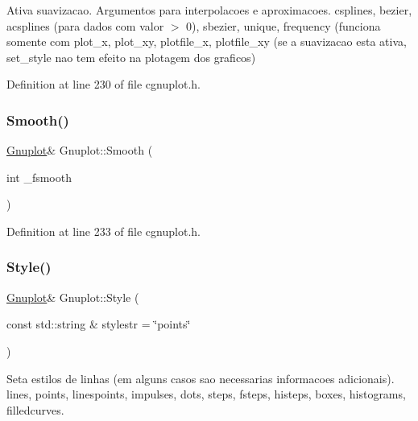 Ativa suavizacao. Argumentos para interpolacoes e aproximacoes. csplines, bezier, acsplines (para dados com valor $>$ 0), sbezier, unique, frequency (funciona somente com plot\+\_\+x, plot\+\_\+xy, plotfile\+\_\+x, plotfile\+\_\+xy (se a suavizacao esta ativa, set\+\_\+style nao tem efeito na plotagem dos graficos) 



Definition at line 230 of file cgnuplot.\+h.

\mbox{\label{class_gnuplot_a9eaf8050edfad9d926d41b102d2f24cb}} 
\subsubsection{\texorpdfstring{Smooth()}{Smooth()}\hspace{0.1cm}{\footnotesize\ttfamily [2/2]}}
{\footnotesize\ttfamily \hyperlink{class_gnuplot}{Gnuplot}\& Gnuplot\+::\+Smooth (\begin{DoxyParamCaption}\item[{int}]{\+\_\+fsmooth }\end{DoxyParamCaption})\hspace{0.3cm}{\ttfamily [inline]}}



Definition at line 233 of file cgnuplot.\+h.

\mbox{\label{class_gnuplot_ae64e911770994ba05cc2f6dcbfe31540}} 
\subsubsection{\texorpdfstring{Style()}{Style()}}
{\footnotesize\ttfamily \hyperlink{class_gnuplot}{Gnuplot}\& Gnuplot\+::\+Style (\begin{DoxyParamCaption}\item[{const std\+::string \&}]{stylestr = {\ttfamily \char`\"{}points\char`\"{}} }\end{DoxyParamCaption})\hspace{0.3cm}{\ttfamily [inline]}}



Seta estilos de linhas (em alguns casos sao necessarias informacoes adicionais). lines, points, linespoints, impulses, dots, steps, fsteps, histeps, boxes, histograms, filledcurves. 



